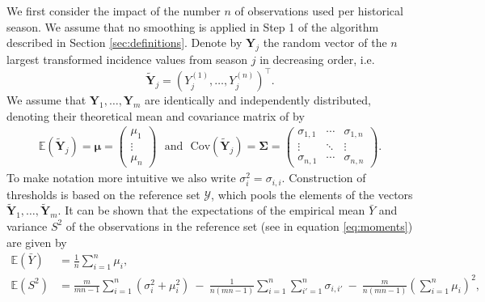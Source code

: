 \documentclass{article}
\newcommand{\sd}{s}
\newcommand{\mean}{\bar{y}}
\begin{document}
We first consider the impact of the number $n$ of observations used per historical season. We assume that no smoothing is applied in Step 1 of the algorithm described in Section \ref{sec:definitions}. Denote by $\mathbf{Y}_j$ the random vector of the $n$ largest transformed incidence values from season $j$ in decreasing order, i.e.
$$
\tilde{\mathbf{Y}}_j = (Y^{(1)}_j, \dots, Y^{(n)}_j)^\top.
$$
We assume that $\mathbf{Y}_1, \dots, \mathbf{Y}_m$ are identically and independently distributed, denoting their theoretical mean and covariance matrix of by
\begin{align}
\mathbb{E}\left(\tilde{\mathbf{Y}}_j\right) = \boldsymbol{\mu} = \left(\begin{array}{c}
\mu_1\\
\vdots\\
\mu_n
\end{array}\right) \ \ \ \text{and} \ \ \ \text{Cov}\left(\tilde{\mathbf{Y}}_j\right) = \boldsymbol{\Sigma} =
\left(\begin{array}{ccc}
\sigma_{1, 1} & \cdots & \sigma_{1, n}\\
\vdots & \ddots &\vdots\\
\sigma_{n, 1} & \cdots & \sigma_{n, n}
\end{array}\right).
\end{align}
To make notation more intuitive we also write $\sigma^2_i = \sigma_{i, i}$. Construction of thresholds is based on the reference set $\mathcal{Y}$, which pools the elements of the vectors $\tilde{\mathbf{Y}}_1, \dots, \tilde{\mathbf{Y}}_m$. It can be shown that the expectations of the empirical mean $\bar{Y}$ and variance $S^2$ of the observations in the reference set (see in equation \eqref{eq:moments}) are given by
\begin{align}
\mathbb{E}(\bar{Y}) & = \frac{1}{n} \sum_{i = 1}^n \mu_i,
\label{eq:expectation_mu}\\
\mathbb{E}(S^2) & = \frac{m}{mn - 1} \sum_{i = 1}^n (\sigma_{i}^2 + \mu_i^2) \ - \ \frac{1}{n(mn - 1)} \sum_{i = 1}^n \sum_{i' = 1}^n \sigma_{i,i'} \ - \ \frac{m}{n(mn - 1)}\left(\sum_{i = 1}^n \mu_i\right)^2,
\label{eq:expectation_sigma2}
\end{align}
\end{document}
